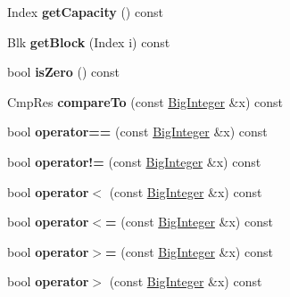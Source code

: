 \begin{DoxyCompactItemize}
Index {\bfseries get\+Capacity} () const
\item 
\mbox{\label{class_big_integer_ad56230d1a06620495ff19207e88c046c}} 
Blk {\bfseries get\+Block} (Index i) const
\item 
\mbox{\label{class_big_integer_a1efcae0566d97df771af90ef0c13d5f7}} 
bool {\bfseries is\+Zero} () const
\item 
\mbox{\label{class_big_integer_a3ed610978db6c403bc800010c9cece89}} 
Cmp\+Res {\bfseries compare\+To} (const \mbox{\hyperlink{class_big_integer}{Big\+Integer}} \&x) const
\item 
\mbox{\label{class_big_integer_a5f6f798f6b3008596824052ee2f19912}} 
bool {\bfseries operator==} (const \mbox{\hyperlink{class_big_integer}{Big\+Integer}} \&x) const
\item 
\mbox{\label{class_big_integer_a6399b87bdf00726b53a1232d2f043ec1}} 
bool {\bfseries operator!=} (const \mbox{\hyperlink{class_big_integer}{Big\+Integer}} \&x) const
\item 
\mbox{\label{class_big_integer_abcd85a7e4607d09d4ab8a3bd08bfb531}} 
bool {\bfseries operator$<$} (const \mbox{\hyperlink{class_big_integer}{Big\+Integer}} \&x) const
\item 
\mbox{\label{class_big_integer_ad18b1c1cc550b1f3efff1ac8a7ffd927}} 
bool {\bfseries operator$<$=} (const \mbox{\hyperlink{class_big_integer}{Big\+Integer}} \&x) const
\item 
\mbox{\label{class_big_integer_adaf680c79ab2a7c24b3d54d1b83bffa7}} 
bool {\bfseries operator$>$=} (const \mbox{\hyperlink{class_big_integer}{Big\+Integer}} \&x) const
\item 
\mbox{\label{class_big_integer_a1584fd7eb09c54e111c4aadea6f15076}} 
bool {\bfseries operator$>$} (const \mbox{\hyperlink{class_big_integer}{Big\+Integer}} \&x) const
\item 
\mbox{\label{class_big_integer_ae3ec1e41a43f6f602784820104b481ca}} 

\end{DoxyCompactItemize}
